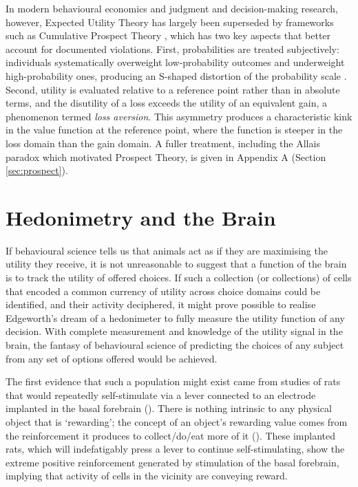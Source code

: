 In modern behavioural economics and judgment and decision-making research, however, Expected Utility Theory has largely been superseded by frameworks such as Cumulative Prospect Theory \cite{tverskyAdvancesProspectTheory1992}, which has two key aspects that better account for documented violations. First, probabilities are treated subjectively: individuals systematically overweight low-probability outcomes and underweight high-probability ones, producing an S-shaped distortion of the probability scale \cite{kahnemanProspectTheoryAnalysis1979}. Second, utility is evaluated relative to a reference point rather than in absolute terms, and the disutility of a loss exceeds the utility of an equivalent gain, a phenomenon termed \textit{loss aversion}. This asymmetry produces a characteristic kink in the value function at the reference point, where the function is steeper in the loss domain than the gain domain. A fuller treatment, including the Allais paradox which motivated Prospect Theory, is given in Appendix A (Section \ref{sec:prospect}).

\clearpage
\section{Hedonimetry and the Brain}\label{subsec:hedonimetry}

If behavioural science tells us that animals act as if they are maximising the utility they receive, it is not unreasonable to suggest that a function of the brain is to track the utility of offered choices. If such a collection (or collections) of cells that encoded a common currency of utility across choice domains could be identified, and their activity deciphered, it might prove possible to realise Edgeworth’s dream of a hedonimeter to fully measure the utility function of any decision. With complete measurement and knowledge of the utility signal in the brain, the fantasy of behavioural science of predicting the choices of any subject from any set of options offered would be achieved.

The first evidence that such a population might exist came from studies of rats that would repeatedly self-stimulate via a lever connected to an electrode implanted in the basal forebrain (\cite{oldsPositiveReinforcementProduced1954}). There is nothing intrinsic to any physical object that is ‘rewarding’; the concept of an object’s rewarding value comes from the reinforcement it produces to collect/do/eat more of it (\cite{salamoneEffortrelatedFunctionsNucleus2007}). These implanted rats, which will indefatigably press a lever to continue self-stimulating, show the extreme positive reinforcement generated by stimulation of the basal forebrain, implying that activity of cells in the vicinity are conveying reward.

